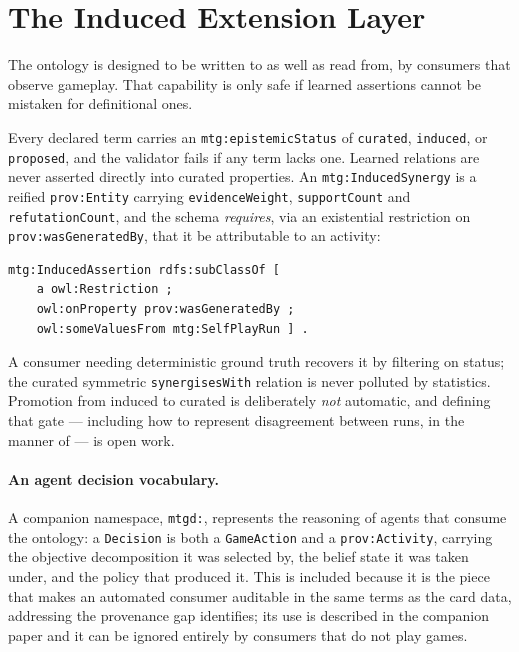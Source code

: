 \documentclass[11pt,a4paper]{article}
\begin{document}
\section{The Induced Extension Layer}
\label{sec:induced}

The ontology is designed to be written to as well as read from, by consumers that observe gameplay. That capability is only safe if learned assertions cannot be mistaken for definitional ones.

Every declared term carries an \texttt{mtg:epistemicStatus} of \texttt{curated}, \texttt{induced}, or \texttt{proposed}, and the validator fails if any term lacks one. Learned relations are never asserted directly into curated properties. An \texttt{mtg:InducedSynergy} is a reified \texttt{prov:Entity} carrying \texttt{evidenceWeight}, \texttt{supportCount} and \texttt{refutationCount}, and the schema \emph{requires}, via an existential restriction on \texttt{prov:wasGeneratedBy}, that it be attributable to an activity:

\begin{lstlisting}[language=Turtle, caption={Provenance as a modelling constraint, not a convention.}]
mtg:InducedAssertion rdfs:subClassOf [
    a owl:Restriction ;
    owl:onProperty prov:wasGeneratedBy ;
    owl:someValuesFrom mtg:SelfPlayRun ] .
\end{lstlisting}

A consumer needing deterministic ground truth recovers it by filtering on status; the curated symmetric \texttt{synergisesWith} relation is never polluted by statistics. Promotion from induced to curated is deliberately \emph{not} automatic, and defining that gate --- including how to represent disagreement between runs, in the manner of \citet{ehrenmuller2026sock} --- is open work.

\paragraph{An agent decision vocabulary.} A companion namespace, \texttt{mtgd:}, represents the reasoning of agents that consume the ontology: a \texttt{Decision} is both a \texttt{GameAction} and a \texttt{prov:Activity}, carrying the objective decomposition it was selected by, the belief state it was taken under, and the policy that produced it. This is included because it is the piece that makes an automated consumer auditable in the same terms as the card data, addressing the provenance gap \citet{sabou2026neurosymbolic} identifies; its use is described in the companion paper \citep{neuburger2026agents} and it can be ignored entirely by consumers that do not play games.
\end{document}
